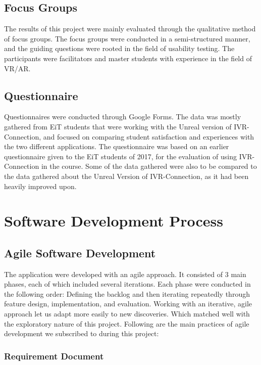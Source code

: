             
            \subsection{Focus Groups}
            The results of this project were mainly evaluated through the qualitative method of focus groups. The focus groups were conducted in a semi-structured manner, and the guiding questions were rooted in the field of usability testing. The participants were facilitators and master students with experience in the field of VR/AR.
            
            \subsection{Questionnaire}
            Questionnaires were conducted through Google Forms. The data was mostly gathered from EiT students that were working with the Unreal version of IVR-Connection, and focused on comparing student satisfaction and experiences with the two different applications. The questionnaire was based on an earlier questionnaire given to the EiT students of 2017, for the evaluation of using IVR-Connection in the course. Some of the data gathered were also to be compared to the data gathered about the Unreal Version of IVR-Connection, as it had been heavily improved upon.  %


    \section{Software Development Process}
        \subsection{Agile Software Development}
            The application were developed with an agile approach. It consisted of 3 main phases, each of which included several iterations. Each phase were conducted in the following order: Defining the backlog and then iterating repeatedly through feature design, implementation, and evaluation. Working with an iterative, agile approach let us adapt more easily to new discoveries. Which matched well with the exploratory nature of this project. Following are the main practices of agile development we subscribed to during this project:
            
            \subsubsection{Requirement Document}
            
